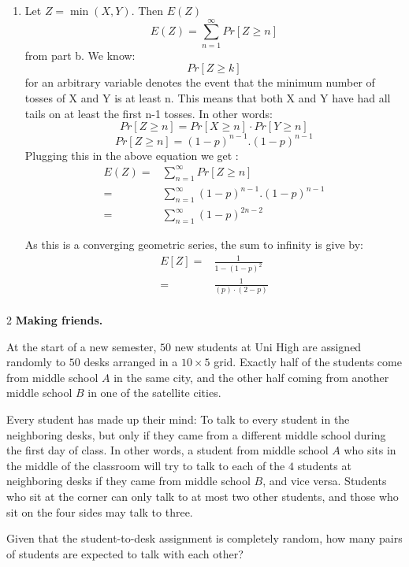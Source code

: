 \documentclass[12pt]{article}
\begin{document}
\begin{solution}
\begin{enumerate}
        
        \item [(c)] Let $Z = \min(X, Y)$. Then $E(Z)$
        \[E(Z) = \sum_{n=1}^\infty Pr[Z\geq n] \] from part b.
         We know:    
        \[Pr[Z \geq k]\] for an arbitrary variable denotes the event that the minimum number of tosses of X and Y is at least n. This means that both X and Y have had all tails on at least the first n-1 tosses. In other words: 
        \[Pr[Z \geq n] = Pr[X \geq n]\cdot Pr[Y \geq n]\]
        \[Pr[Z \geq n ] = (1-p)^{n-1} . (1-p)^{n-1}\]
        Plugging this in the above equation we get : 
        \begin{align*}
        E(Z) =& \sum_{n=1}^\infty Pr[Z\geq n] \\
             =& \sum_{n=1}^\infty(1-p)^{n-1} . (1-p)^{n-1} \\
             =& \sum_{n=1}^\infty(1-p)^{2n-2} 
        \end{align*}

        As this is a converging geometric series, the sum to infinity is give by:
        \begin{align*}
        E[Z] =& \frac{1}{1- (1-p)^{2}} \\
                    =& \frac{1}{(p)\cdot (2-p)}\\
        \end{align*}
    \end{enumerate} 
\end{solution}

\newpage

\begin{problem}{2}
    \textbf{Making friends.} 
    
    At the start of a new semester, $50$ new students at Uni High are assigned randomly to $50$ desks arranged in a $10 \times 5$ grid. Exactly half of the students come from middle school $A$ in the same city, and the other half coming from another middle school $B$ in one of the satellite cities.

    Every student has made up their mind: To talk to every student in the neighboring desks, but only if they came from a different middle school during the first day of class. In other words, a student from middle school $A$ who sits in the middle of the classroom will try to talk to each of the $4$ students at neighboring desks if they came from middle school $B$, and vice versa. Students who sit at the corner can only talk to at most two other students, and those who sit on the four sides may talk to three.
    
    Given that the student-to-desk assignment is completely random, how many pairs of students are expected to talk with each other?
\end{problem}
\end{document}
